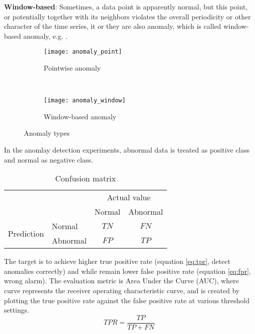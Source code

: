 \textbf{Window-based}: Sometimes, a data point is apparently normal, but this point, or potentially together with its neighbors violates the overall periodicity or other character of the time series, it or they are also anomaly, which is called window-based anomaly, e.g. .\\
\begin{figure}[h]
\centering
	\begin {subfigure}[t]{8cm}
	\centering
	\texttt{[image: anomaly\_point]}
	\caption{Pointwise anomaly}
	\label{fig:point}
	\end{subfigure}
	~
	\begin {subfigure}[t]{8cm}
	\centering
	\texttt{[image: anomaly\_window]}
	\caption{Window-based anomaly}
	\label{fig:window}
	\end{subfigure}
	\caption[Anomaly types]{Anomaly types}
\label{fig:anomalytypes}

\end{figure}




In the anomlay detection experiments, abnormal data is treated as positive class and normal as negative class. 

\begin{table}[h]
\begin{center}
\begin{tabular}{l|l|c|c|}
\multicolumn{2}{c}{}&\multicolumn{2}{c}{Actual value}\\
\cline{3-4}
\multicolumn{2}{c|}{}&Normal&Abnormal\\
\cline{2-4}
\multirow{2}{*}{Prediction}& Normal & $TN$ & $FN$\\
\cline{2-4}
& Abnormal & $FP$ & $TP$\\
\cline{2-4}
\end{tabular}
\end{center}
\label{tab:conf}
\caption{Confusion matrix}
\end{table}

The target is to achieve higher true positive rate (equation \ref{eq:tpr}, detect anomalies correctly) and while remain lower false positive rate (equation \ref{eq:fpr}, wrong alarm). The evaluation metric is Area Under the Curve (AUC), where curve represents the receiver operating characteristic curve, and is created by plotting the true positive rate against the false positive rate at various threshold settings.
\begin{equation} \label{eq:tpr}
TPR =\dfrac{TP}{TP+FN}
\end{equation}

